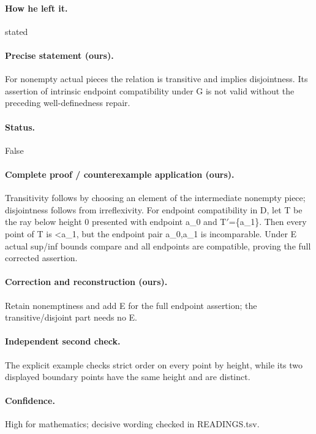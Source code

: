 \paragraph{How he left it.} stated

\paragraph{Precise statement (ours).} For nonempty actual pieces the relation is transitive and implies disjointness. Its assertion of intrinsic endpoint compatibility under G is not valid without the preceding well-definedness repair.

\paragraph{Status.} False

\paragraph{Complete proof / counterexample application (ours).} Transitivity follows by choosing an element of the intermediate nonempty piece; disjointness follows from irreflexivity. For endpoint compatibility in D, let T be the ray below height 0 presented with endpoint a\_0 and T\ensuremath{\prime}=\{a\_1\}. Then every point of T is <a\_1, but the endpoint pair a\_0,a\_1 is incomparable. Under E actual sup/inf bounds compare and all endpoints are compatible, proving the full corrected assertion.

\paragraph{Correction and reconstruction (ours).} Retain nonemptiness and add E for the full endpoint assertion; the transitive/disjoint part needs no E.

\paragraph{Independent second check.} The explicit example checks strict order on every point by height, while its two displayed boundary points have the same height and are distinct.

\paragraph{Confidence.} High for mathematics; decisive wording checked in READINGS.tsv.

